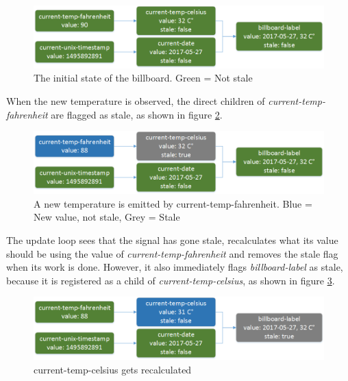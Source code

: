 \begin{figure}[h]
	\centerline{\includegraphics[width=\textwidth]{images/language-frdataflow-1.png}}
	\caption{The initial state of the billboard. Green = Not stale}
	\label{fig:language-frdataflow-1}
\end{figure}

When the new temperature is observed, the direct children of \textit{current-temp-fahrenheit} are flagged as stale, as shown in figure \ref{fig:language-frdataflow-2}.

\begin{figure}[h]
	\centerline{\includegraphics[width=\textwidth]{images/language-frdataflow-2.png}}
	\caption{A new temperature is emitted by current-temp-fahrenheit. Blue = New value, not stale, Grey = Stale}
	\label{fig:language-frdataflow-2}
\end{figure}

The update loop sees that the signal has gone stale, recalculates what its value should be using the value of \textit{current-temp-fahrenheit} and removes the stale flag when its work is done.
However, it also immediately flags \textit{billboard-label} as stale, because it is registered as a child of \textit{current-temp-celsius}, as shown in figure \ref{fig:language-frdataflow-3}.

\begin{figure}[h]
	\centerline{\includegraphics[width=\textwidth]{images/language-frdataflow-3.png}}
	\caption{current-temp-celsius gets recalculated}
	\label{fig:language-frdataflow-3}
\end{figure}

